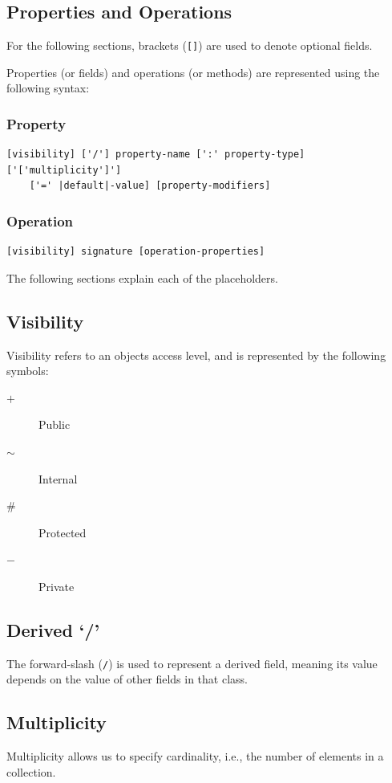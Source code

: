 \documentclass{article}
\begin{document}
\subsection{Properties and Operations}
For the following sections, brackets (\lstinline{[]}) are used to denote optional fields.

Properties (or fields) and operations (or methods) are represented using the following syntax:
\subsubsection{Property}
\begin{lstlisting}[numbers=none, escapeinside=||]
[visibility] ['/'] property-name [':' property-type] ['['multiplicity']'] 
    ['=' |default|-value] [property-modifiers]
\end{lstlisting}
\subsubsection{Operation}
\begin{lstlisting}[numbers=none]
[visibility] signature [operation-properties]
\end{lstlisting}
The following sections explain each of the placeholders.
\subsection{Visibility}
Visibility refers to an objects access level, and is represented by the following symbols:
\begin{description}
    \item[\(+\)] Public
    \item[\(\sim\)] Internal
    \item[\(\#\)] Protected
    \item[\(-\)] Private
\end{description}
\subsection{Derived `/'}
The forward-slash (\lstinline{/}) is used to represent a derived field, meaning its value depends on
the value of other fields in that class.
\subsection{Multiplicity}
Multiplicity allows us to specify cardinality, i.e., the number of elements in a collection.
\end{document}
